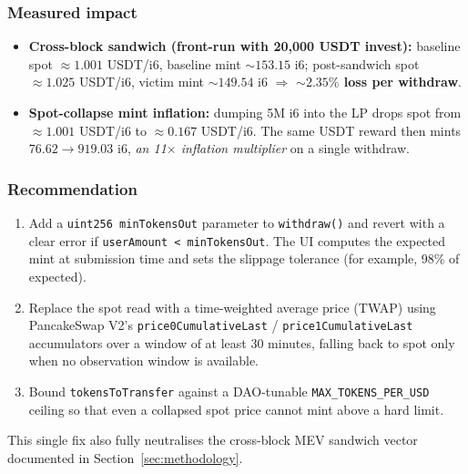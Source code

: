 \documentclass[11pt,a4paper]{article}
\begin{document}
\subsubsection*{Measured impact}

\begin{itemize}[leftmargin=*]
    \item \textbf{Cross-block sandwich (front-run with 20{,}000 USDT invest):}
          baseline spot $\approx 1.001$ USDT/i6, baseline mint
          ${\sim}153.15$ i6; post-sandwich spot $\approx 1.025$ USDT/i6,
          victim mint ${\sim}149.54$ i6 $\Rightarrow$ \textbf{${\sim}2.35\%$
          loss per withdraw}.
    \item \textbf{Spot-collapse mint inflation:} dumping 5M i6 into the LP
          drops spot from $\approx 1.001$ USDT/i6 to $\approx 0.167$
          USDT/i6. The same USDT reward then mints
          $76.62 \rightarrow 919.03$ i6, \emph{an 11$\times$ inflation
          multiplier} on a single withdraw.
\end{itemize}

\subsubsection*{Recommendation}

\begin{enumerate}[leftmargin=*]
    \item Add a \texttt{uint256 minTokensOut} parameter to
          \texttt{withdraw()} and revert with a clear error if
          \texttt{userAmount < minTokensOut}. The UI computes the expected
          mint at submission time and sets the slippage tolerance (for
          example, 98\% of expected).
    \item Replace the spot read with a time-weighted average price (TWAP)
          using PancakeSwap V2's \texttt{price0CumulativeLast} /
          \texttt{price1CumulativeLast} accumulators over a window of at
          least 30 minutes, falling back to spot only when no observation
          window is available.
    \item Bound \texttt{tokensToTransfer} against a DAO-tunable
          \texttt{MAX\_TOKENS\_PER\_USD} ceiling so that even a collapsed
          spot price cannot mint above a hard limit.
\end{enumerate}

This single fix also fully neutralises the cross-block MEV sandwich vector
documented in Section~\ref{sec:methodology}.
\end{document}
